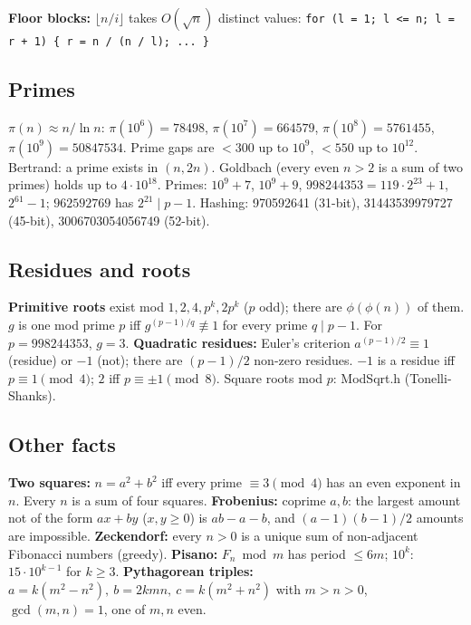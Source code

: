 \textbf{Floor blocks:} $\lfloor n/i \rfloor$ takes $O(\sqrt n)$ distinct values:
\texttt{for (l = 1; l <= n; l = r + 1) \{ r = n / (n / l); ... \}}

\subsection{Primes}
$\pi(n)\approx n/\ln n$: $\pi(10^6)=78498$, $\pi(10^7)=664579$, $\pi(10^8)=5761455$,
$\pi(10^9)=50847534$. Prime gaps are $< 300$ up to $10^9$, $< 550$ up to $10^{12}$.
Bertrand: a prime exists in $(n, 2n)$. Goldbach (every even $n > 2$ is a sum of two primes)
holds up to $4\cdot10^{18}$. Primes: $10^9+7$, $10^9+9$, $998244353=119\cdot2^{23}+1$,
$2^{61}-1$; $962592769$ has $2^{21}\mid p-1$. Hashing: 970592641 (31-bit),
31443539979727 (45-bit), 3006703054056749 (52-bit).

\subsection{Residues and roots}
\textbf{Primitive roots} exist mod $1, 2, 4, p^k, 2p^k$ ($p$ odd); there are $\phi(\phi(n))$ of
them. $g$ is one mod prime $p$ iff $g^{(p-1)/q}\not\equiv1$ for every prime $q\mid p-1$.
For $p = 998244353$, $g = 3$.
\textbf{Quadratic residues:} Euler's criterion $a^{(p-1)/2}\equiv 1$ (residue) or $-1$ (not);
there are $(p-1)/2$ non-zero residues. $-1$ is a residue iff $p\equiv1 \pmod 4$; $2$ iff
$p\equiv\pm1 \pmod 8$. Square roots mod $p$: ModSqrt.h (Tonelli-Shanks).

\subsection{Other facts}
\textbf{Two squares:} $n=a^2+b^2$ iff every prime $\equiv 3 \pmod 4$ has an even exponent in $n$.
Every $n$ is a sum of four squares. \textbf{Frobenius:} coprime $a, b$: the largest amount not of the
form $ax+by$ ($x,y\ge0$) is $ab-a-b$, and $(a-1)(b-1)/2$ amounts are impossible.
\textbf{Zeckendorf:} every $n>0$ is a unique sum of non-adjacent Fibonacci numbers (greedy).
\textbf{Pisano:} $F_n \bmod m$ has period $\le 6m$; $10^k$: $15\cdot10^{k-1}$ for $k\ge3$.
\textbf{Pythagorean triples:} $a=k(m^2-n^2),\ b=2kmn,\ c=k(m^2+n^2)$ with $m>n>0$,
$\gcd(m,n)=1$, one of $m,n$ even.

